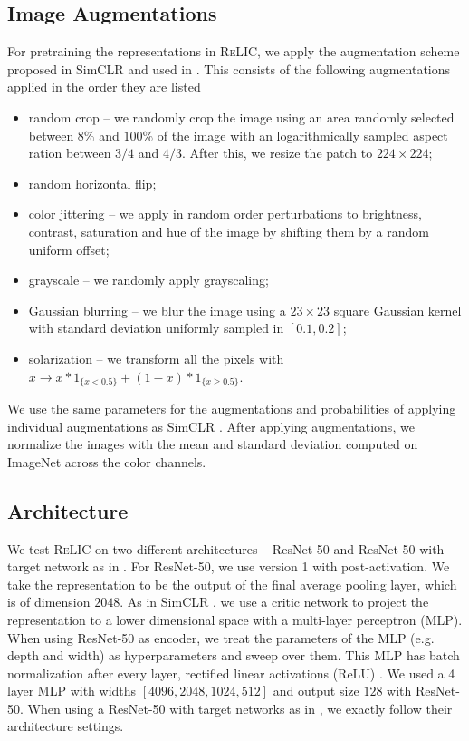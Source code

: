 \documentclass{article}
\newcommand{\relic}{\textsc{ReLIC}}
\begin{document}
\subsection{Image Augmentations} \label{sec:aug_app}
For pretraining the representations in \relic{}, we apply the augmentation scheme proposed in SimCLR \citep{chen2020simple} and used in \citep{grill2020bootstrap}.
This consists of the following augmentations applied in the order they are listed
\begin{itemize}
    \item random crop -- we randomly crop the image using an area randomly selected between $8\%$ and $100\%$ of the image with an logarithmically sampled aspect ration between $3/4$ and $4/3$. After this, we resize the patch to $224\times224$;
    \item random horizontal flip;
    \item color jittering -- we apply in random order perturbations to brightness, contrast, saturation and hue of the image by shifting them by a random uniform offset;
    \item grayscale -- we randomly apply grayscaling;
    \item Gaussian blurring -- we blur the image using a $23\times23$ square Gaussian kernel with standard deviation uniformly sampled in $[0.1, 0.2]$;
    \item solarization -- we transform all the pixels with $x\rightarrow x* 1_{\{x<0.5\}} + (1-x) * 1_{\{x\geq0.5\}}$.
\end{itemize}
We use the same parameters for the augmentations and probabilities of applying individual augmentations as SimCLR \citep{chen2020simple}.
After applying augmentations, we normalize the images with the mean and standard deviation computed on ImageNet across the color channels.

\subsection{Architecture}
We test \relic{} on two different architectures -- ResNet-50 \citep{he2016deep} and ResNet-50 with target network as in \citep{grill2020bootstrap}.
For ResNet-50, we use version 1 with post-activation.
We take the representation to be the output of the final average pooling layer, which is of dimension $2048$.
As in SimCLR \citep{chen2020simple}, we use a critic network to project the representation to a lower dimensional space with a multi-layer perceptron (MLP).
When using ResNet-50 as encoder, we treat the parameters of the MLP (e.g. depth and width) as hyperparameters and sweep over them.
This MLP has batch normalization \citep{Ioffe2015BatchNA} after every layer, rectified linear activations (ReLU) \citep{Nair2010RectifiedLU}.
We used a 4 layer MLP with widths $[4096, 2048, 1024, 512]$ and output size $128$ with ResNet-50.
When using a ResNet-50 with target networks as in \citep{grill2020bootstrap}, we exactly follow their architecture settings.
\end{document}

